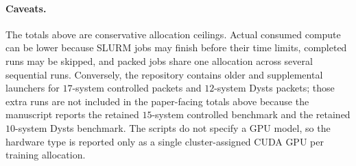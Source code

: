 \paragraph{Caveats.}
The totals above are conservative allocation ceilings.  Actual consumed compute
can be lower because SLURM jobs may finish before their time limits, completed
runs may be skipped, and packed jobs share one allocation across several
sequential runs.  Conversely, the repository contains older and supplemental
launchers for \(17\)-system controlled packets and \(12\)-system Dysts packets;
those extra runs are not included in the paper-facing totals above because the
manuscript reports the retained \(15\)-system controlled benchmark and the
retained \(10\)-system Dysts benchmark.  The scripts do not specify a GPU model,
so the hardware type is reported only as a single cluster-assigned CUDA GPU per
training allocation.
